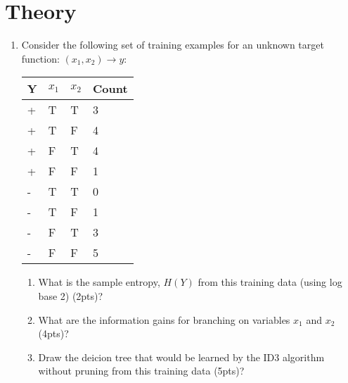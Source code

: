 \documentclass[12pt]{article}
\begin{document}
\section{Theory}
\begin{enumerate}
\item Consider the following set of training examples for an unknown target function:  $(x_1, x_2)\rightarrow y$:
\begin{table}[h]
\begin{center}
\begin{tabular}{|l|l|l|l|}
\hline
Y & $x_1$ & $x_2$ & Count\\
\hline
+ & T & T & 3\\
+ & T & F & 4\\
+ & F & T & 4\\
+ & F & F & 1\\
- & T & T & 0\\
- & T & F & 1\\
- & F & T & 3\\
- & F & F & 5\\
\hline
\end{tabular}
\end{center}
\end{table}
	\begin{enumerate}
	\item What is the sample entropy, $H(Y)$ from this training data (using log base 2) (2pts)?
	\item What are the information gains for branching on variables $x_1$ and $x_2$ (4pts)?
	\item Draw the deicion tree that would be learned by the ID3 algorithm without pruning from this training data (5pts)?
	\end{enumerate}
	

\end{enumerate}
\end{document}
